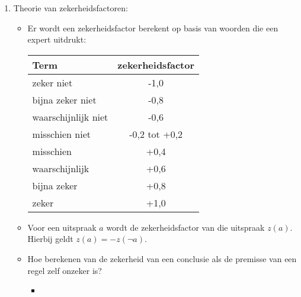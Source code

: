 \begin{itemize}
\begin{itemize}
\begin{enumerate}
\begin{itemize}
				Als $a = $ het regent morgen en $b = $ het regent niet morgen, dan is $p(a\; \hbox{\textbf{en}}\;b) = 0$. 
				
				Als $a = $ het regent morgen en $b = $ het regent morgenochtend, dan is $p(a\; \hbox{\textbf{en}}\;b) = 0,2$
				
				\alert Bayesiaans redeneren is geen aangewezen methode.
			\end{itemize}
			\item Theorie van zekerheidsfactoren:
			\begin{itemize}
				\item Er wordt een zekerheidsfactor berekent op basis van woorden die een expert uitdrukt:
				\begin{table}[h]
					\centering
					\begin{tabular}{| l | c |}
						\hline 
						Term & zekerheidsfactor \\
						\hline 
						zeker niet & -1,0 \\
						bijna zeker niet & -0,8 \\
						waarschijnlijk niet & -0,6 \\
						misschien niet & -0,2 tot +0,2 \\
						misschien & +0,4 \\
						waarschijnlijk & +0,6 \\
						bijna zeker & +0,8 \\
						zeker & +1,0 \\
						\hline
					\end{tabular}
				\end{table}
			
				\item Voor een uitspraak $a$ wordt de zekerheidsfactor van die uitspraak $z(a)$. Hierbij geldt $z(a) = -z(\neg a)$.
				
				\item Hoe berekenen van de zekerheid van een conclusie als de premisse van een regel zelf onzeker is?
				
				\begin{itemize}
					
					\item[] \noindent{}
		

\end{itemize}
\end{itemize}
\end{enumerate}
\end{itemize}
\end{itemize}
